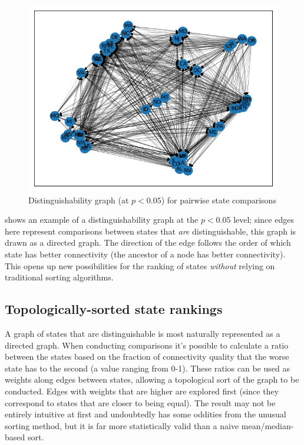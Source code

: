 \begin{figure}[h]
    \centering
    \includegraphics[width=\textwidth]{images/caida/caida_network_valid_comps.png}
    \caption{Distinguishability graph (at $p<0.05$) for pairwise state comparisons}
    \label{fig:caida_network_valid_comps}
\end{figure}

 shows an example of a distinguishability graph at the $p<0.05$ level; since edges here represent comparisons between states that \textit{are} distinguishable, this graph is drawn as a directed graph. The direction of the edge follows the order of which state has better connectivity (the ancestor of a node has better connectivity). This opens up new possibilities for the ranking of states \textit{without} relying on traditional sorting algorithms.

\subsection{Topologically-sorted state rankings}

A graph of states that are distinguishable is most naturally represented as a directed graph. When conducting comparisons it's possible to calculate a ratio between the states based on the fraction of connectivity quality that the worse state has to the second (a value ranging from 0-1). These ratios can be used as weights along edges between states, allowing a topological sort of the graph to be conducted. Edges with weights that are higher are explored first (since they correspond to states that are closer to being equal). The result may not be entirely intuitive at first and undoubtedly has some oddities from the unusual sorting method, but it is far more statistically valid than a naive mean/median-based sort.

